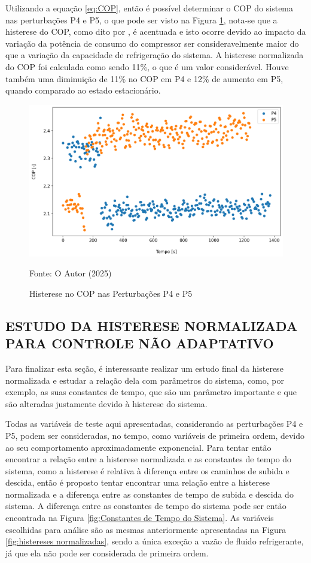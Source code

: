 Utilizando a equação \ref{eq:COP}, então é possível determinar o COP do sistema nas perturbações P4 e P5, o que pode ser visto na Figura \ref{fig:Análise do COP Histerese}, nota-se que a histerese do COP, como dito por \textcite{MASCHE2021302}, é acentuada e isto ocorre devido ao impacto da variação da potência de consumo do compressor ser consideravelmente maior do que a variação da capacidade de refrigeração do sistema. A histerese normalizada do COP foi calculada como sendo 11\%, o que é um valor considerável. Houve também uma diminuição de 11\% no COP em P4 e 12\% de aumento em P5, quando comparado ao estado estacionário.
\newpage
\begin{figure}[h]
    \centering
    \includegraphics[width=1\linewidth]{FigurasdoTexto/COP Histerese.png}
    \caption{Histerese no COP nas Perturbações P4 e P5}
    \label{fig:Análise do COP Histerese}
    {\footnotesize Fonte: O Autor (2025)}
\end{figure}

\subsection{\MakeUppercase{Estudo da Histerese Normalizada para Controle Não Adaptativo}}

Para finalizar esta seção, é interessante realizar um estudo final da histerese normalizada e estudar a relação dela com parâmetros do sistema, como, por exemplo, as suas constantes de tempo, que são um parâmetro importante e que são alteradas justamente devido à histerese do sistema.  

Todas as variáveis de teste aqui apresentadas, considerando as perturbações P4 e P5, podem ser consideradas, no tempo, como variáveis de primeira ordem, devido ao seu comportamento aproximadamente exponencial. Para tentar então encontrar a relação entre a histerese normalizada e as constantes de tempo do sistema, como a histerese é relativa à diferença entre os caminhos de subida e descida, então é proposto tentar encontrar uma relação entre a histerese normalizada e a diferença entre as constantes de tempo de subida e descida do sistema.
\newpage
A diferença entre as constantes de tempo do sistema pode ser então encontrada na Figura \ref{fig:Constantes de Tempo do Sistema}. As variáveis escolhidas para análise são as mesmas anteriormente apresentadas na Figura \ref{fig:histereses normalizadas}, sendo a única exceção a vazão de fluido refrigerante, já que ela não pode ser considerada de primeira ordem.

